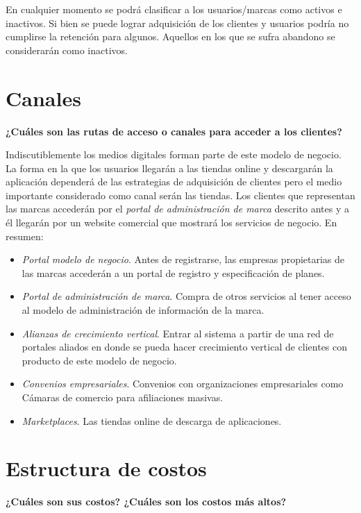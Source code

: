 En cualquier momento se podrá clasificar a los usuarios/marcas como activos e inactivos. Si bien se puede lograr adquisición de los clientes y usuarios podría no cumplirse la retención para algunos. Aquellos en los que se sufra abandono se considerarán como inactivos.

\section{Canales}

\textbf{¿Cuáles son las rutas de acceso o canales para acceder a los clientes?}

Indiscutiblemente los medios digitales forman parte de este modelo de negocio. La forma en la que los usuarios llegarán a las tiendas online y descargarán la aplicación dependerá de las estrategias de adquisición de clientes pero el medio importante considerado como canal serán las tiendas. Los clientes que representan las marcas accederán por el \textit{portal de administración de marca} descrito antes y a él llegarán por un website comercial que mostrará los servicios de negocio. En resumen:

\begin{itemize}
    \item \textit{Portal modelo de negocio}. Antes de registrarse, las empresas propietarias de las marcas accederán a un portal de registro y especificación de planes. 
    \item \textit{Portal de administración de marca}. Compra de otros servicios al tener acceso al modelo de administración de información de la marca.
    \item \textit{Alianzas de crecimiento vertical}. Entrar al sistema a partir de una red de portales aliados en donde se pueda hacer crecimiento vertical de clientes con producto de este modelo de negocio.
    \item \textit{Convenios empresariales}. Convenios con organizaciones empresariales como Cámaras de comercio para afiliaciones masivas.
    \item \textit{Marketplaces}. Las tiendas online de descarga de aplicaciones.
\end{itemize}

\section{Estructura de costos}

\textbf{¿Cuáles son sus costos? ¿Cuáles son los costos más altos?}

